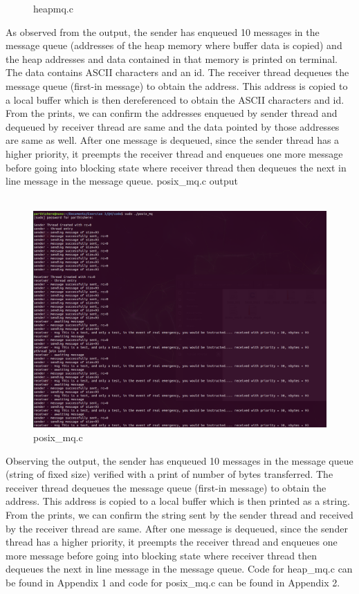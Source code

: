 \documentclass[a4paper,11pt]{article}%
\newenvironment{qanda}{\setlength{\parindent}{0pt}}{\bigskip}
\begin{document}
\begin{qanda}
\begin{enumerate}
\begin{enumerate}
\begin{figure}[H]
						\caption{heapmq.c}
					\end{figure}


				      As observed from the output, the sender has enqueued 10 messages in the message queue (addresses of the heap memory where buffer data is copied) and the heap addresses and data contained in that memory is printed on terminal. The data contains ASCII characters and an id. The receiver thread dequeues the message queue (first-in message) to obtain the address. This address is copied to a local buffer which is then dereferenced to obtain the ASCII characters and id. From the prints, we can confirm the addresses enqueued by sender thread and dequeued by receiver thread are same and the data pointed by those addresses are same as well. After one message is dequeued, since the sender thread has a higher priority, it preempts the receiver thread and enqueues one more message before going into blocking state where receiver thread then dequeues the next in line message in the message queue.
				      posix\_mq.c output\\\\
					  \begin{figure}[H]
						\centering
						\includegraphics[scale=0.6]{figures/posix_mq.png}
						\caption{posix\_mq.c}
					\end{figure}

				      Observing the output, the sender has enqueued 10 messages in the message queue (string of fixed size) verified with a print of number of bytes transferred. The receiver thread dequeues the message queue (first-in message) to obtain the address. This address is copied to a local buffer which is then printed as a string. From the prints, we can confirm the string sent by the sender thread and received by the receiver thread are same. After one message is dequeued, since the sender thread has a higher priority, it preempts the receiver thread and enqueues one more message before going into blocking state where receiver thread then dequeues the next in line message in the message queue.
				      Code for heap\_mq.c can be found in Appendix 1 and code for posix\_mq.c can be found in Appendix 2.


\end{enumerate}
\end{enumerate}
\end{qanda}
\end{document}
